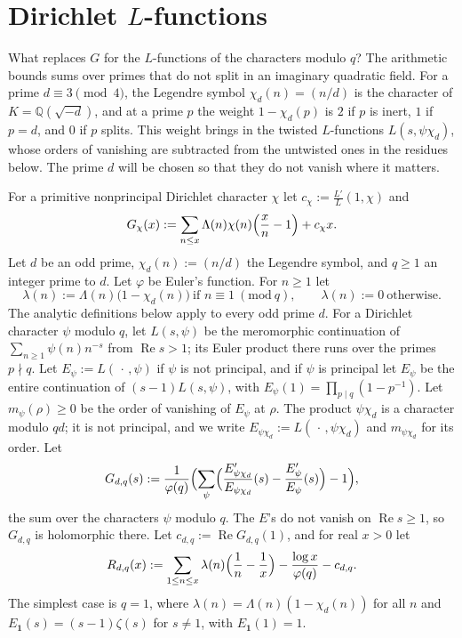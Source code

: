 \documentclass[reqno]{amsart}
\theoremstyle{definition}
\theoremstyle{plain}
\newcommand{\Q}{\mathbb{Q}}
\renewcommand{\Re}{\operatorname{Re}}
\newcommand{\one}{\mathbf{1}}
\begin{document}
\section{Dirichlet \texorpdfstring{$L$}{L}-functions}\label{sec:dirichlet}

What replaces $G$ for the $L$-functions of the characters modulo $q$?  The arithmetic bounds sums over primes that do not split in an imaginary quadratic field.  For a prime $d \equiv 3 \pmod 4$, the Legendre symbol $\chi_d(n) = (n/d)$ is the character of $K = \Q(\sqrt{-d})$, and at a prime $p$ the weight $1 - \chi_d(p)$ is $2$ if $p$ is inert, $1$ if $p = d$, and $0$ if $p$ splits.  This weight brings in the twisted $L$-functions $L(s, \psi\chi_d)$, whose orders of vanishing are subtracted from the untwisted ones in the residues below.  The prime $d$ will be chosen so that they do not vanish where it matters.

For a primitive nonprincipal Dirichlet character $\chi$ let $c_\chi := \frac{L'}{L}(1, \chi)$ and
\begin{equation}\label{eq:Gchi}
  G_\chi(x) := \sum_{n \le x} \Lambda(n) \chi(n) \Bigl(\frac{x}{n} - 1\Bigr) + c_\chi x .
\end{equation}
Let $d$ be an odd prime, $\chi_d(n) := (n/d)$ the Legendre symbol, and $q \ge 1$ an integer prime to $d$.  Let $\varphi$ be Euler's function.  For $n \ge 1$ let
\[
  \lambda(n) := \Lambda(n)\bigl(1 - \chi_d(n)\bigr) \ \text{if } n \equiv 1 \ (\mathrm{mod}\ q),
  \qquad \lambda(n) := 0 \ \text{otherwise}.
\]
The analytic definitions below apply to every odd prime $d$.  For a Dirichlet character $\psi$ modulo $q$, let $L(s, \psi)$ be the meromorphic continuation of $\sum_{n \ge 1} \psi(n) n^{-s}$ from $\Re s > 1$; its Euler product there runs over the primes $p \nmid q$.  Let $E_\psi := L(\,\cdot\,, \psi)$ if $\psi$ is not principal, and if $\psi$ is principal let $E_\psi$ be the entire continuation of $(s - 1)L(s, \psi)$, with $E_\psi(1) = \prod_{p \mid q}(1 - p^{-1})$.  Let $m_\psi(\rho) \ge 0$ be the order of vanishing of $E_\psi$ at $\rho$.  The product $\psi\chi_d$ is a character modulo $qd$; it is not principal, and we write $E_{\psi\chi_d} := L(\,\cdot\,, \psi\chi_d)$ and $m_{\psi\chi_d}$ for its order.  Let
\[
  G_{d,q}(s) := \frac{1}{\varphi(q)} \Bigl( \sum_{\psi} \Bigl( \frac{E_{\psi\chi_d}'}{E_{\psi\chi_d}}(s) - \frac{E_\psi'}{E_\psi}(s) \Bigr) - 1 \Bigr),
\]
the sum over the characters $\psi$ modulo $q$.  The $E$'s do not vanish on $\Re s \ge 1$, so $G_{d,q}$ is holomorphic there.  Let $c_{d,q} := \Re G_{d,q}(1)$, and for real $x > 0$ let
\begin{equation}\label{eq:R}
  R_{d,q}(x) := \sum_{1 \le n \le x} \lambda(n) \Bigl( \frac1n - \frac1x \Bigr) - \frac{\log x}{\varphi(q)} - c_{d,q} .
\end{equation}
The simplest case is $q = 1$, where $\lambda(n) = \Lambda(n)(1 - \chi_d(n))$ for all $n$ and $E_{\one}(s) = (s - 1)\zeta(s)$ for $s \ne 1$, with $E_{\one}(1) = 1$.
\end{document}
